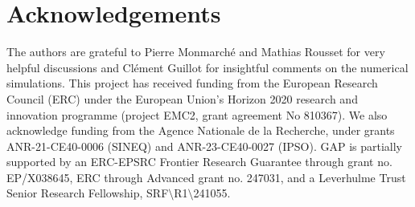 \documentclass[onefignum,onetabnum]{siamart251216} %
\newif\ifsiamart
\theoremstyle{plain}
\numberwithin{equation}{section}
\numberwithin{theorem}{section}
\begin{document}
\section*{Acknowledgements}
The authors are grateful to Pierre Monmarché and Mathias Rousset for very helpful discussions and Clément Guillot for insightful comments on the numerical simulations.
This project has received funding from the European Research Council (ERC) under the European Union’s Horizon 2020 research and innovation programme (project EMC2, grant agreement No 810367).
We also acknowledge funding from the Agence Nationale de la Recherche, under grants ANR-21-CE40-0006 (SINEQ) and ANR-23-CE40-0027 (IPSO).
GAP is partially supported by an ERC-EPSRC Frontier Research
Guarantee through grant no. EP/X038645, ERC through Advanced grant no. 247031,
and a Leverhulme Trust Senior Research Fellowship, SRF{$\setminus$}R1{$\setminus$}241055.
\ifsiamart


\else
\printbibliography
\fi
\end{document}
